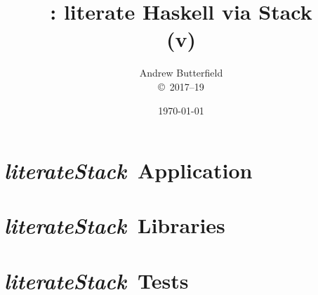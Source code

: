 \documentclass[fleqn,10pt]{report}
\author{
Andrew Butterfield
\\
{\small \copyright\ 2017--19}
}
\title{
  \literateStack: literate Haskell via Stack
  \\(v\litStackVersion)
}
\date{
\today
}
\def\literateStack{\textit{\textsf{literateStack}}}
\begin{document}
\maketitle
\tableofcontents


\chapter{\literateStack\ Application}



\chapter{\literateStack\ Libraries}



\chapter{\literateStack\ Tests}

% 



\end{document}
